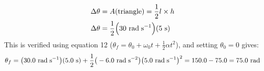 \documentclass[a4paper]{article}
\newcommand\rads{\text{ rad\;s}^{-1}}
\newcommand\radss{\text{ rad\;s}^{-2}}
\newcommand\rad{\text{ rad}}
\newcommand\s{\text{ s}}
\begin{document}
\begin{shaded}
\begin{enumerate}
\begin{center}
        \end{center}
        \begin{align*}
            \Delta\theta &= A(\text{triangle}) = \frac{1}{2}l \times h\\
            \Delta\theta &= \frac{1}{2}\Big(30\rads\Big)(5\s)
        \end{align*}
        This is verified using equation 12 ($\theta_f = \theta_0 + \omega_0t + \frac{1}{2}\alpha t^2$), and setting $\theta_0 = 0$ gives:
        \begin{align*}
            \theta_f = \big(30.0\rads\big)(5.0\s) + \frac{1}{2}\big(-6.0\radss\big)\big(5.0\rads\big)^2 = 150.0 - 75.0 = 75.0\rad
        \end{align*}
    \end{enumerate}
\end{shaded}
\end{document}
